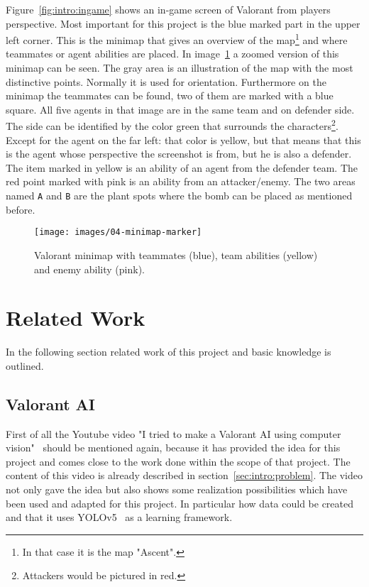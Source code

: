 Figure~\ref{fig:intro:ingame} shows an in-game screen of Valorant from players perspective. Most 
important for this project is the blue marked part in the upper left corner. This is the minimap that 
gives an overview of the map\footnote{In that case it is the map "Ascent".} and where teammates or 
agent abilities are placed. In image~\ref{fig:intro:minimap} a zoomed version of this minimap can be 
seen. The gray area is an illustration of the map with the most distinctive points. Normally it is used 
for orientation. Furthermore on the minimap the teammates can be found, two of them are marked 
with a blue square. All five agents in that image are in the same team and on defender side. The side 
can be identified by the color green that surrounds the characters\footnote{Attackers would 
be pictured in red.}.  Except for the agent on the far left: that color is yellow, but that 
means that this is the agent whose perspective the screenshot is from, but he is also a defender. 
The item marked in yellow is an ability of an agent from the defender team. The red point marked 
with pink is an ability from an attacker/enemy. The two areas named \texttt{A} and \texttt{B} are the 
plant spots where the bomb can be placed as mentioned before.

\begin{figure}
	\centering
	\texttt{[image: images/04-minimap-marker]}
	\caption[Valorant minimap.]{Valorant minimap with teammates (blue), team abilities (yellow) and 
	enemy ability (pink).}
	\label{fig:intro:minimap}
\end{figure}


\section{Related Work}\label{sec:intro:relatedWork}

In the following section related work of this project and basic knowledge is outlined.

\subsection[Video: Valorant AI]{Valorant AI}\label{subsec:intro:video}

First of all the Youtube video "I tried to make a Valorant AI using computer vision"~\cite{river2021} 
should be mentioned again, because it has provided the idea for this project and comes close to 
the work done within the scope of that project. The content of this video is already described in 
section~\ref{sec:intro:problem}. The video not only gave the idea but also shows some realization 
possibilities which have been used and adapted for this project. In particular how data could be 
created and that it uses YOLOv5~\cite{jocher2020} as a learning framework.

